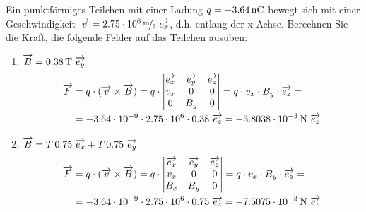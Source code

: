 \begin{ejercicio}
    Ein punktförmiges Teilchen mit einer Ladung $q=\unit[-3.64]{nC}$ bewegt sich mit einer Geschwindigkeit $\vec{v}=\unitfrac[2.75 \cdot 10^{6}]{m}{s} \ \vec{e_x}$, d.h. entlang der x-Achse. Berechnen Sie die Kraft, die folgende Felder auf das Teilchen ausüben:
    \begin{enumerate}
        \item $\vec{B}=\unit[0.38]{T} \ \vec{e_y}$
        \begin{align*}
            \vec{F} &= q\cdot (\vec{v} \times \vec{B}) = q\cdot \begin{vmatrix}
                \vec{e_x} & \vec{e_y} & \vec{e_z} \\
                v_x & 0 & 0 \\
                0 & B_y & 0
            \end{vmatrix} = q \cdot v_x \cdot B_y\cdot \vec{e_z} =\\&= -3.64 \cdot 10^{-9} \cdot 2.75 \cdot 10^{6} \cdot 0.38 \ \vec{e_z} = \unit[-3.8038 \cdot 10^{-3}]{N}\ \vec{e_z}
        \end{align*}
        \item $\vec{B}=\unit[T]{0.75} \ \vec{e_x} + \unit[T]{0.75} \ \vec{e_y}$
        \begin{align*}
            \vec{F} &= q\cdot (\vec{v} \times \vec{B}) = q\cdot \begin{vmatrix}
                \vec{e_x} & \vec{e_y} & \vec{e_z} \\
                v_x & 0 & 0 \\
                B_x & B_y & 0
            \end{vmatrix} = q \cdot v_x \cdot B_y\cdot \vec{e_z} =\\&= -3.64 \cdot 10^{-9} \cdot 2.75 \cdot 10^{6} \cdot 0.75 \ \vec{e_z} = \unit[-7.5075 \cdot 10^{-3}]{N}\ \vec{e_z}
        \end{align*}
    \end{enumerate}
\end{ejercicio}


